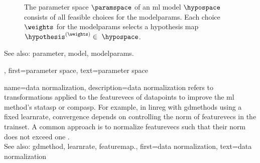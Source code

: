 {{\begin{figure}[H]
\begin{center}
			\end{center} 
			\caption{The \gls{parameter} space $\paramspace$ of an \gls{ml} \gls{model} $\hypospace$ consists of all 
			feasible choices for the \glspl{modelparam}. Each choice $\weights$ for the \glspl{modelparam} 
			selects a \gls{hypothesis} \gls{map} $\hypothesis^{(\weights)} \in \hypospace$.
				 \label{fig_param_space_dict}} 
			\end{figure}
			See also: \gls{parameter}, \gls{model}, \glspl{modelparam}.},
		first={parameter space},
		text={parameter space}
}

{name={data normalization},
	description={\Gls{data} normalization refers to transformations 
		applied to the \glspl{featurevec} of \glspl{datapoint} to improve the \gls{ml} method's 
		\gls{statasp} or \gls{compasp}. For example, in \gls{linreg} with \glspl{gdmethod} using 
		a fixed \gls{learnrate}, \gls{convergence} depends on controlling the \gls{norm} of \glspl{featurevec} 
		in the \gls{trainset}. A common approach is to normalize \glspl{featurevec} such that their 
		\gls{norm} does not exceed one \cite[Ch.\ 5]{MLBasics}.
				\\
		See also:  \gls{gdmethod}, \gls{learnrate}, \gls{featuremap}.},
	first={data normalization},
	text={data normalization}
}

